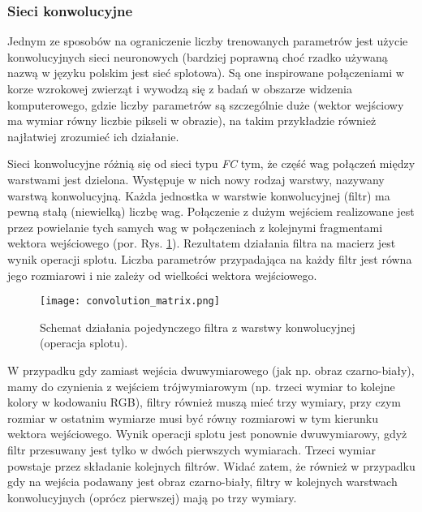 \subsubsection*{Sieci konwolucyjne}
Jednym ze sposobów na ograniczenie liczby trenowanych parametrów jest użycie konwolucyjnych sieci neuronowych (bardziej poprawną choć rzadko używaną nazwą w języku polskim jest sieć splotowa). Są one inspirowane połączeniami w korze wzrokowej zwierząt i wywodzą się z badań w obszarze widzenia komputerowego, gdzie liczby parametrów są szczególnie duże (wektor wejściowy ma wymiar równy liczbie pikseli w obrazie), na takim przykładzie również najłatwiej zrozumieć ich działanie.

Sieci konwolucyjne różnią się od sieci typu \textit{FC} tym, że część wag połączeń między warstwami jest dzielona. Występuje w nich nowy rodzaj warstwy, nazywany warstwą konwolucyjną. Każda jednostka w warstwie konwolucyjnej (filtr) ma pewną stałą (niewielką) liczbę wag. Połączenie z dużym  wejściem realizowane jest przez powielanie tych samych wag w połączeniach z kolejnymi fragmentami wektora wejściowego (por. Rys. \ref{fig:convolution}). Rezultatem działania filtra na macierz jest wynik operacji splotu. Liczba parametrów przypadająca na każdy filtr jest równa jego rozmiarowi i nie zależy od wielkości wektora wejściowego. 

\begin{figure}[h]
	\centering
	\texttt{[image: convolution\_matrix.png]}
	\caption{Schemat działania pojedynczego filtra z warstwy konwolucyjnej (operacja splotu).}
	\label{fig:convolution}
\end{figure}

W przypadku gdy zamiast wejścia dwuwymiarowego (jak np. obraz czarno-biały), mamy do czynienia z wejściem trójwymiarowym (np. trzeci wymiar to kolejne kolory w kodowaniu RGB), filtry również muszą mieć trzy wymiary, przy czym rozmiar w ostatnim wymiarze musi być równy rozmiarowi w tym kierunku wektora wejściowego. Wynik operacji splotu jest ponownie dwuwymiarowy, gdyż filtr przesuwany jest tylko w dwóch pierwszych wymiarach. Trzeci wymiar powstaje przez składanie kolejnych filtrów. Widać zatem, że również w przypadku gdy na wejścia podawany jest obraz czarno-biały, filtry w kolejnych warstwach konwolucyjnych (oprócz pierwszej) mają po trzy wymiary.

